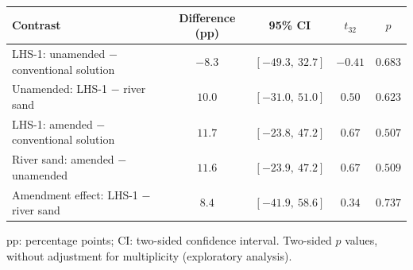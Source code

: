 \begin{tabular}{lcccc}
\hline\hline
\textbf{Contrast} & \textbf{Difference (pp)} & \textbf{95\% CI} & \textbf{$t_{32}$} & \textbf{$p$} \\
\hline
LHS-1: unamended $-$ conventional solution & $-8.3$ & $[-49.3,\ 32.7]$ & $-0.41$ & $0.683$ \\
Unamended: LHS-1 $-$ river sand & $10.0$ & $[-31.0,\ 51.0]$ & $0.50$ & $0.623$ \\
LHS-1: amended $-$ conventional solution & $11.7$ & $[-23.8,\ 47.2]$ & $0.67$ & $0.507$ \\
River sand: amended $-$ unamended & $11.6$ & $[-23.9,\ 47.2]$ & $0.67$ & $0.509$ \\
Amendment effect: LHS-1 $-$ river sand & $8.4$ & $[-41.9,\ 58.6]$ & $0.34$ & $0.737$ \\
\hline
\end{tabular}
\par\vspace{4pt}
\parbox{0.94\linewidth}{\footnotesize pp: percentage points; CI: two-sided confidence interval. Two-sided $p$ values, without adjustment for multiplicity (exploratory analysis).}
